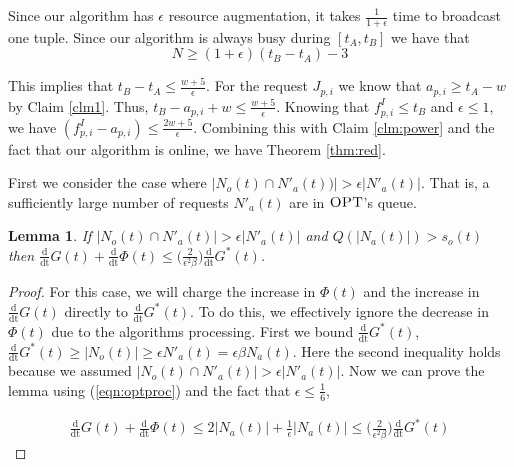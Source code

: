 \documentclass[11pt]{article}
\newtheorem{lemma}{Lemma}[section]
\newcommand{\opt}{\textrm{\sc OPT}}
\newcommand{\eps}{\epsilon}
\newcommand{\ddphi}{\frac{\mathrm{d}}{\mathrm{dt}} \Phi}
\newcommand{\ddhopt}{\frac{\mathrm{d}}{\mathrm{dt}} G^*}
\newcommand{\ddg}{\frac{\mathrm{d}}{\mathrm{dt}} G}
\begin{document}
Since our algorithm has $\eps$ resource augmentation, it takes $\frac{1}{1+\eps}$ time to broadcast one tuple.  Since our algorithm is always busy during $[t_A,t_B]$ we have that $$ N \geq (1+\eps)(t_B -t_A) -3$$

 

 
This implies that $t_B - t_A \leq \frac{w +5}{\eps}$.  For the request $J_{p,i}$ we know that $a_{p,i} \geq t_A - w$ by Claim \ref{clm1}. Thus, $t_B - a_{p,i} + w \leq \frac{w +5}{\eps}$. Knowing that $f^I_{p,i} \leq t_B$ and $\eps \leq 1$, we have $(f^I_{p,i} - a_{p,i}) \leq  \frac{2w +5}{\eps} $.  Combining this with Claim \ref{clm:power} and the fact that our algorithm is online, we have Theorem \ref{thm:red}.




















\iffalse

 First we consider the case where $| N_o(t) \cap N'_a(t))| > \eps|N'_a(t)|$.  That is, a sufficiently large number of requests $N'_a(t)$ are in $\opt$'s queue.

\begin{lemma}
\label{lem:optflow}
If $|N_o(t) \cap N'_a(t)| > \eps|N'_a(t)|$ and $Q(|N_a(t)|) >  s_o(t)$ then $\ddg(t) + \ddphi(t) \leq \Big (\frac{2}{\eps^2\beta} \Big ) \ddhopt(t)$.
\end{lemma} 
\begin{proof}
For this case, we will charge the increase in $\Phi(t)$ and the increase in $\ddg(t)$ directly to $\ddhopt(t)$.  To do this, we effectively ignore the decrease in $\Phi(t)$ due to the algorithms processing.  First we bound $\ddhopt(t)$, $\ddhopt(t) \geq |N_o(t) | \geq \eps N'_a(t) = \eps \beta  N_a(t)$.  Here the second inequality holds because we assumed $|N_o(t) \cap N'_a(t)| > \eps|N'_a(t)|$.  Now we can prove the lemma using (\ref{eqn:optproc}) and the fact that $\eps \leq \frac{1}{6}$,

\begin{eqnarray*}
\ddg(t) + \ddphi(t) \leq  2|N_a(t)| + \frac{1}{\eps} |N_a(t)| \leq \Big (\frac{2}{\eps^2\beta} \Big ) \ddhopt(t)
\end{eqnarray*}

\end{proof}
\end{document}
